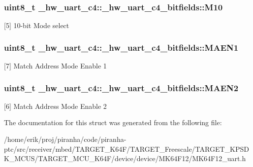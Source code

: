 \subsubsection[{\texorpdfstring{M10}{M10}}]{\setlength{\rightskip}{0pt plus 5cm}uint8\+\_\+t \+\_\+hw\+\_\+uart\+\_\+c4\+::\+\_\+hw\+\_\+uart\+\_\+c4\+\_\+bitfields\+::\+M10}\hypertarget{struct__hw__uart__c4_1_1__hw__uart__c4__bitfields_aa5fdc1d8d6883d8252a0677a585d104a}{}\label{struct__hw__uart__c4_1_1__hw__uart__c4__bitfields_aa5fdc1d8d6883d8252a0677a585d104a}
\mbox{[}5\mbox{]} 10-\/bit Mode select 
\subsubsection[{\texorpdfstring{M\+A\+E\+N1}{MAEN1}}]{\setlength{\rightskip}{0pt plus 5cm}uint8\+\_\+t \+\_\+hw\+\_\+uart\+\_\+c4\+::\+\_\+hw\+\_\+uart\+\_\+c4\+\_\+bitfields\+::\+M\+A\+E\+N1}\hypertarget{struct__hw__uart__c4_1_1__hw__uart__c4__bitfields_a637675cd39af95c369eceb3e505310d9}{}\label{struct__hw__uart__c4_1_1__hw__uart__c4__bitfields_a637675cd39af95c369eceb3e505310d9}
\mbox{[}7\mbox{]} Match Address Mode Enable 1 
\subsubsection[{\texorpdfstring{M\+A\+E\+N2}{MAEN2}}]{\setlength{\rightskip}{0pt plus 5cm}uint8\+\_\+t \+\_\+hw\+\_\+uart\+\_\+c4\+::\+\_\+hw\+\_\+uart\+\_\+c4\+\_\+bitfields\+::\+M\+A\+E\+N2}\hypertarget{struct__hw__uart__c4_1_1__hw__uart__c4__bitfields_a988db9de35f2e039cbbcfbe1d4b8e4dc}{}\label{struct__hw__uart__c4_1_1__hw__uart__c4__bitfields_a988db9de35f2e039cbbcfbe1d4b8e4dc}
\mbox{[}6\mbox{]} Match Address Mode Enable 2 

The documentation for this struct was generated from the following file\+:\begin{DoxyCompactItemize}
\item 
/home/erik/proj/piranha/code/piranha-\/ptc/src/receiver/mbed/\+T\+A\+R\+G\+E\+T\+\_\+\+K64\+F/\+T\+A\+R\+G\+E\+T\+\_\+\+Freescale/\+T\+A\+R\+G\+E\+T\+\_\+\+K\+P\+S\+D\+K\+\_\+\+M\+C\+U\+S/\+T\+A\+R\+G\+E\+T\+\_\+\+M\+C\+U\+\_\+\+K64\+F/device/device/\+M\+K64\+F12/M\+K64\+F12\+\_\+uart.\+h\end{DoxyCompactItemize}
